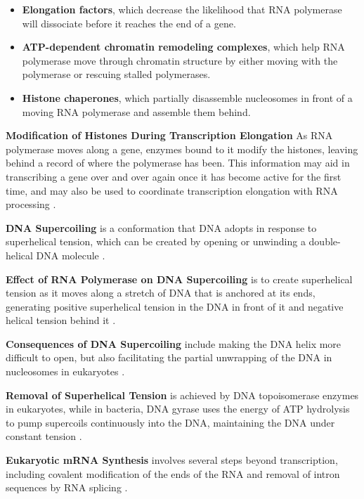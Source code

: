 \begin{highlight}
    \begin{itemize}
        \item \textbf{Elongation factors}, which decrease the likelihood that RNA polymerase will dissociate before it reaches the end of a gene.
        \item \textbf{ATP-dependent chromatin remodeling complexes}, which help RNA polymerase move through chromatin structure by either moving with the polymerase or rescuing stalled polymerases.
        \item \textbf{Histone chaperones}, which partially disassemble nucleosomes in front of a moving RNA polymerase and assemble them behind.
    \end{itemize}
\end{highlight}

\textbf{Modification of Histones During Transcription Elongation}
As RNA polymerase moves along a gene, enzymes bound to it modify the histones, leaving behind a record of where the polymerase has been. This information may aid in transcribing a gene over and over again once it has become active for the first time, and may also be used to coordinate transcription elongation with RNA processing \cite*{L1-Chapter6}.

\textbf{DNA Supercoiling} is a conformation that DNA adopts in response to superhelical tension, which can be created by opening or unwinding a double-helical DNA molecule \cite*{L1-Chapter6}.

\textbf{Effect of RNA Polymerase on DNA Supercoiling} is to create superhelical tension as it moves along a stretch of DNA that is anchored at its ends, generating positive superhelical tension in the DNA in front of it and negative helical tension behind it \cite*{L1-Chapter6}.

\textbf{Consequences of DNA Supercoiling} include making the DNA helix more difficult to open, but also facilitating the partial unwrapping of the DNA in nucleosomes in eukaryotes \cite*{L1-Chapter6}.

\textbf{Removal of Superhelical Tension} is achieved by DNA topoisomerase enzymes in eukaryotes, while in bacteria, DNA gyrase uses the energy of ATP hydrolysis to pump supercoils continuously into the DNA, maintaining the DNA under constant tension \cite*{L1-Chapter6}.

\textbf{Eukaryotic mRNA Synthesis} involves several steps beyond transcription, including covalent modification of the ends of the RNA and removal of intron sequences by RNA splicing \cite*{L1-Chapter6}.

